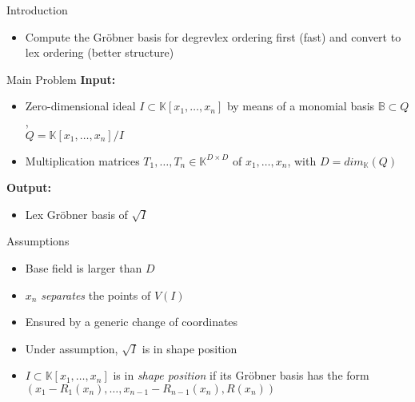 \documentclass[final]{beamer}
\newlength{\onecolwid}
\begin{document}
\begin{frame}[t]
\begin{columns}[t]
\begin{column}{\onecolwid}
\begin{block}{Introduction}


\begin{itemize}
	\item Compute the Gr\"obner basis for degrevlex ordering first (fast) and convert to lex ordering (better structure)
\end{itemize}


\end{block}

\begin{alertblock}{Main Problem}
	\textbf{Input: }
	\begin{itemize}
	\item Zero-dimensional ideal $I \subset
	\mathbb{K}[x_1,\dots,x_n]$ by means of a monomial basis 
	$\mathbb{B} \subset Q$,\\ 
	$Q = \mathbb{K}[x_1,\dots,x_n]/I$
	\item Multiplication matrices  $T_1,\dots, T_n \in 
	\mathbb{K}^{D \times D}$ of $x_1,\dots,x_n$, with
	$D = dim_{\mathbb{K}}(Q)$
	\end{itemize}
	\textbf{Output:}
	\begin{itemize}
		\item Lex Gr\"obner basis of $\sqrt{I}$
	\end{itemize}
\end{alertblock}

\begin{alertblock}{Assumptions}
	\begin{itemize}
		\item Base field is larger than $D$
		\item $x_n$ \textit{separates} the points of $V(I)$
		\item Ensured by a generic change of coordinates
		\item Under assumption, $\sqrt{I}$ is in shape position
		\item $I \subset \mathbb{K}[x_1,\dots,x_n]$ is in \textit{shape position} if its Gr\"obner basis has the form $(x_1-R_1(x_n), 
		\dots, x_{n-1}-R_{n-1}(x_n), R(x_n))$
	\end{itemize}
\end{alertblock}


\end{column}
\end{columns}
\end{frame}
\end{document}
